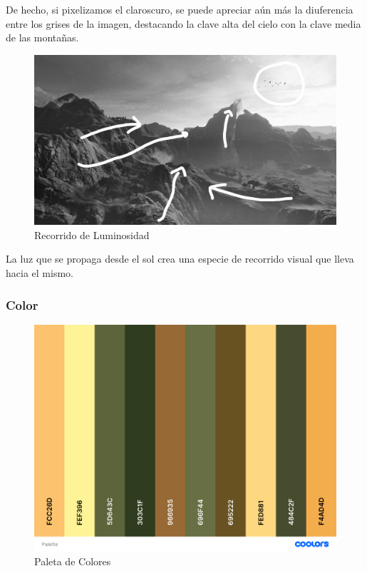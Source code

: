 \documentclass[12pt]{article}
\begin{document}
          De hecho, si pixelizamos el claroscuro, se puede apreciar aún más la diuferencia entre los grises de la imagen, destacando la clave alta del cielo con la clave media de las montañas.

          \begin{figure}[H]
            \centering
            \includegraphics[width=\textwidth]{images/Jesus/Seccion16/recorrido luz.jpg}
            \caption{Recorrido de Luminosidad}
          \end{figure}  

          La luz que se propaga desde el sol crea una especie de recorrido visual que lleva hacia el mismo. 


        \subsubsection{Color}

          \begin{figure}[H]
            \centering
            \includegraphics[width=\textwidth]{images/Jesus/Seccion16/palette.png}
            \caption{Paleta de Colores}
          \end{figure} 
\end{document}
